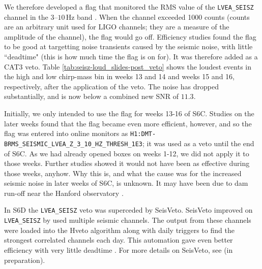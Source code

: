 We therefore developed a flag that monitored the RMS value of the \verb|LVEA_SEISZ| channel in the $3$--$10\,$Hz band \cite{ref:https://wiki.ligo.org/DetChar/H1LVEASEISZS6Cflag}. When the channel exceeded 1000 counts (counts are an arbitrary unit used for \ac{LIGO} channels; they are a measure of the amplitude of the channel), the flag would go off. Efficiency studies found the flag to be good at targetting noise transients caused by the seismic noise, with little ``deadtime" (this is how much time the flag is on for). It was therefore added as a CAT3 veto. Table \ref{tab:seisz-loud_slides-post_veto} shows the loudest events in the high and low chirp-mass bin in weeks 13 and 14 and weeks 15 and 16, respectively, after the application of the veto. The noise has dropped substantially, and is now below a combined new \ac{SNR} of $11.3$.

Initially, we only intended to use the flag for weeks 13-16 of S6C. Studies on the later weeks found that the flag became even more efficient, however, and so the flag was entered into online monitors as \verb|H1:DMT-BRMS_SEISMIC_LVEA_Z_3_10_HZ_THRESH_1E3|; it was used as a veto until the end of S6C. As we had already opened boxes on weeks 1-12, we did not apply it to those weeks. Further studies showed it would not have been as effective during those weeks, anyhow. Why this is, and what the cause was for the increased seismic noise in later weeks of S6C, is unknown. It may have been due to dam run-off near the Hanford observatory \cite{ref:Lundgren_comm}.

In S6D the \verb|LVEA_SEISZ| veto was superceded by SeisVeto. SeisVeto improved on \verb|LVEA_SEISZ| by used multiple seismic channels. The output from these channels were loaded into the Hveto algorithm along with daily \ihope triggers to find the strongest correlated channels each day. This automation gave even better efficiency with very little deadtime \cite{ref:https://wiki.ligo.org/DetChar/SeisVeto}. For more details on SeisVeto, see \cite{ref:SeisVeto} (in preparation).

